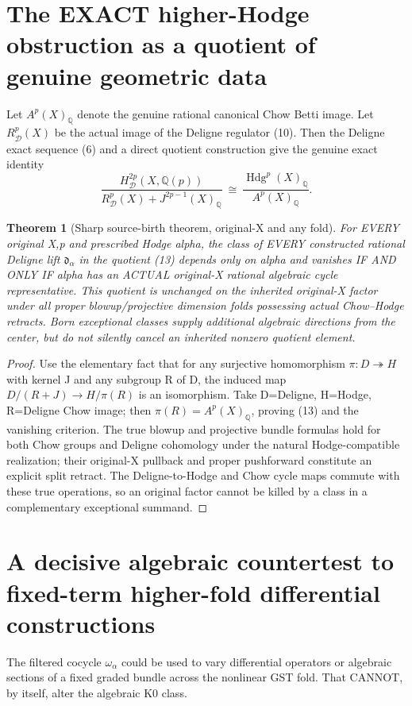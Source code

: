 \documentclass[11pt]{article}
\newtheorem{theorem}{Theorem}[section]
\begin{document}
\section{The EXACT higher-Hodge obstruction as a quotient of genuine geometric data}
Let $A^p(X)_\mathbb Q$ denote the genuine rational
canonical Chow Betti image. Let
$R^p_{\mathcal D}(X)$ be the actual image of
the Deligne regulator (10).
Then the Deligne exact sequence (6) and a direct
quotient construction give the genuine exact identity
\[
 \boxed{
 \frac{H_{\mathcal D}^{2p}(X,\mathbb Q(p))}
 {R^p_{\mathcal D}(X)+J^{2p-1}(X)_\mathbb Q}
 \ \cong\
 \frac{\operatorname{Hdg}^p(X)_\mathbb Q}
 {A^p(X)_\mathbb Q}.
 }                                                       \tag{13}
\]
\begin{theorem}[Sharp source-birth theorem, original-X and any fold]
For EVERY original X,p and prescribed Hodge alpha,
the class of EVERY constructed rational Deligne
lift $\mathfrak d_\alpha$ in the quotient (13)
depends only on alpha and vanishes IF AND ONLY IF
alpha has an ACTUAL original-X rational
algebraic cycle representative.
This quotient is unchanged on the inherited
original-X factor under all proper blowup/projective
dimension folds possessing actual Chow--Hodge retracts.
Born exceptional classes supply additional
algebraic directions from the center, but do not
silently cancel an inherited nonzero quotient element.
\end{theorem}
\begin{proof}
Use the elementary fact that for any surjective
homomorphism $\pi:D\twoheadrightarrow H$
with kernel J and any subgroup R of D,
the induced map
$D/(R+J)\to H/\pi(R)$ is an isomorphism.
Take D=Deligne, H=Hodge, R=Deligne Chow image;
then $\pi(R)=A^p(X)_\mathbb Q$, proving (13)
and the vanishing criterion.
The true blowup and projective bundle
formulas hold for both Chow groups and
Deligne cohomology under the natural Hodge-compatible
realization; their original-X pullback and proper
pushforward constitute an explicit split retract.
The Deligne-to-Hodge and Chow cycle maps
commute with these true operations, so an
original factor cannot be killed by a class
in a complementary exceptional summand.
\end{proof}

\section{A decisive algebraic countertest to fixed-term higher-fold differential constructions}
The filtered cocycle $\omega_\alpha$ could be used to
vary differential operators or algebraic sections of
a fixed graded bundle across the nonlinear GST fold.
That CANNOT, by itself, alter the algebraic K0 class.
\end{document}
